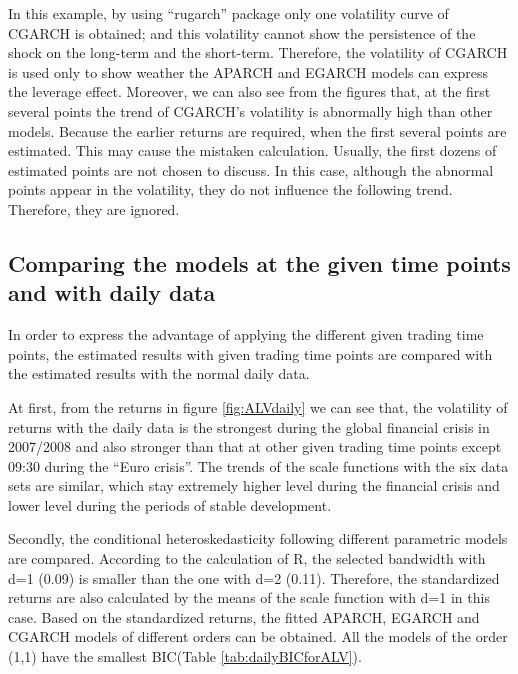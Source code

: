 In this example, by using ``rugarch'' package only one volatility curve of CGARCH is obtained; and this volatility cannot show the persistence of the shock on the long-term and the short-term. Therefore, the volatility of CGARCH is used only to show weather the APARCH and EGARCH models can express the leverage effect. Moreover, we can also see from the figures that, at the first several points the trend of CGARCH’s volatility is abnormally high than other models. Because the earlier returns are required, when the first several points are estimated. This may cause the mistaken calculation. Usually, the first dozens of estimated points are not chosen to discuss. In this case, although the abnormal points appear in the volatility, they do not influence the following trend. Therefore, they are ignored.



\subsection{Comparing the models at the given time points and with daily data}

In order to express the advantage of applying the different given trading time points, the estimated results with given trading time points are compared with the estimated results with the normal daily data.

At first, from the returns in figure \ref{fig:ALVdaily} we can see that, the volatility of returns with the daily data is the strongest during the global financial crisis in 2007/2008 and also stronger than that at other given trading time points except 09:30 during the ``Euro crisis''. The trends of the scale functions with the six data sets are similar, which stay extremely higher level during the financial crisis and lower level during the periods of stable development.


Secondly, the conditional heteroskedasticity following different parametric models are compared. According to the calculation of R, the selected bandwidth with d=1 (0.09) is smaller than the one with d=2 (0.11). Therefore, the standardized returns are also calculated by the means of the scale function with d=1 in this case. Based on the standardized returns, the fitted APARCH, EGARCH and CGARCH models of different orders can be obtained. All the models of the order (1,1) have the smallest BIC(Table \ref{tab:dailyBICforALV}).




